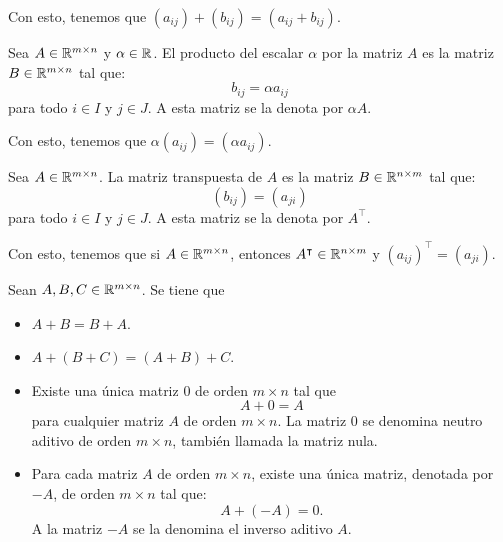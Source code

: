 \documentclass[a4,11pt]{aleph-notas}
\begin{document}
\begin{advertencia}
    Con esto, tenemos que $(a_{ij})+(b_{ij})=(a_{ij} + b_{ij})$.
\end{advertencia}

\begin{defi}
    Sea $A\in \Mat[\R]{m}{n}$ y $\alpha \in \R$. El producto del escalar $\alpha$ por la matriz $A$ es la matriz $B\in \Mat[\R]{m}{n}$ tal que:
    \[ 
        b_{ij} = \alpha a_{ij}
    \]
    para todo $i \in I$ y $j \in J$. A esta matriz se la denota por $\alpha A$.
\end{defi}

\begin{advertencia}
    Con esto, tenemos que $\alpha (a_{ij}) =(\alpha a_{ij})$.
\end{advertencia}

\begin{defi}
    Sea $A \in \Mat[\R]{m}{n}$. La matriz transpuesta de $A$ es la matriz $B\in \Mat[\R]{n}{m}$ tal que: 
    \[
        (b_{ij}) = (a_{ji})
    \]
    para todo $i\in I$ y $j \in J$. A esta matriz se la denota por $A^\intercal$.
\end{defi}

\begin{advertencia}
    Con esto, tenemos que si $A\in \Mat[\R]{m}{n}$, entonces $A^\intercal\in \Mat[\R]{n}{m}$ y $(a_{ij})^\intercal =(a_{ji})$.
\end{advertencia}

\begin{teo}
    Sean $A,B,C\in\Mat[\R]{m}{n}$. Se tiene que
    \begin{itemize}
    \item 
        $A + B = B + A$.
    \item 
        $A + (B+C) = (A + B)+C$.
    \item 
        Existe una única matriz $0$ de orden $m \times n$ tal que 
        \[ 
            A + 0 =  A 
        \]
        para cualquier matriz $A$ de orden $m \times n$. La matriz $0$ se denomina neutro aditivo de orden $m \times n$, también llamada la matriz nula.
    \item 
        Para cada matriz $A$ de orden $m \times n$, existe una única matriz, denotada por $-A$, de orden $m \times n$ tal que:
        \[
            A + (-A) = 0.
        \]
        A la matriz $-A$ se la denomina el inverso aditivo $A$.
    \end{itemize}
\end{teo}
\end{document}

